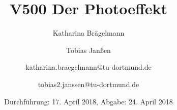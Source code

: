 
\title{V500 Der Photoeffekt}
\author{Katharina Brägelmann \and Tobias Janßen \and katharina.braegelmann@tu-dortmund.de \and tobias2.janssen@tu-dortmund.de}
\date{Durchführung: 17. April 2018, Abgabe: 24. April 2018}
\maketitle

\tableofcontents
